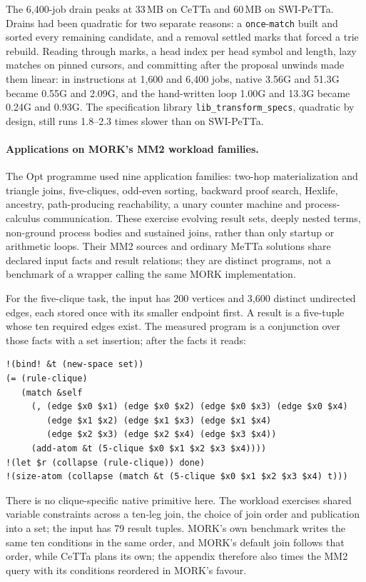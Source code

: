 \documentclass[11pt]{article}
\newcommand{\code}[1]{\texttt{#1}}
\newcommand{\PeTTa}{\textup{PeTTa}}
\newcommand{\CeTTa}{\textup{CeTTa}}
\begin{document}
\noindent
The 6{,}400-job drain peaks at 33\,MB on \CeTTa{} and 60\,MB on
SWI-\PeTTa{}.  Drains had been quadratic for two separate reasons: a
\code{once}-\code{match} built and sorted every remaining candidate, and a
removal settled marks that forced a trie rebuild.  Reading through marks, a
head index per head symbol and length, lazy matches on pinned cursors, and
committing after the proposal unwinds made them linear: in instructions at
1{,}600 and 6{,}400 jobs, native 3.56G and 51.3G became 0.55G and 2.09G, and
the hand-written loop 1.00G and 13.3G became 0.24G and 0.93G.  The
specification library \code{lib\_transform\_specs}, quadratic by design, still
runs 1.8--2.3 times slower than on SWI-\PeTTa{}.

\paragraph{Applications on MORK's MM2 workload families.}
The Opt programme used nine application families: two-hop materialization
and triangle joins, five-cliques, odd-even sorting, backward proof search,
Hexlife, ancestry, path-producing reachability, a unary counter machine and
process-calculus communication.  These exercise evolving result sets, deeply
nested terms, non-ground process bodies and sustained joins, rather than
only startup or arithmetic loops.  Their MM2 sources and ordinary MeTTa
solutions share declared input facts and result relations; they are distinct
programs, not a benchmark of a wrapper calling the same MORK implementation.


For the five-clique task, the input has 200 vertices and 3,600 distinct
undirected edges, each stored once with its smaller endpoint first.  A
result is a five-tuple whose ten required edges exist.  The measured program
is a conjunction over those facts with a set insertion; after the facts it
reads:
\begin{lstlisting}[style=metta]
!(bind! &t (new-space set))
(= (rule-clique)
   (match &self
     (, (edge $x0 $x1) (edge $x0 $x2) (edge $x0 $x3) (edge $x0 $x4)
        (edge $x1 $x2) (edge $x1 $x3) (edge $x1 $x4)
        (edge $x2 $x3) (edge $x2 $x4) (edge $x3 $x4))
     (add-atom &t (5-clique $x0 $x1 $x2 $x3 $x4))))
!(let $r (collapse (rule-clique)) done)
!(size-atom (collapse (match &t (5-clique $x0 $x1 $x2 $x3 $x4) t)))
\end{lstlisting}
There is no clique-specific native primitive here.  The workload exercises
shared variable constraints across a ten-leg join, the choice of join order
and publication into a set; the input has 79 result tuples.  MORK's own
benchmark writes the same ten conditions in the same order, and MORK's
default join follows that order, while \CeTTa{} plans its own; the appendix
therefore also times the MM2 query with its conditions reordered in MORK's
favour.
\end{document}
